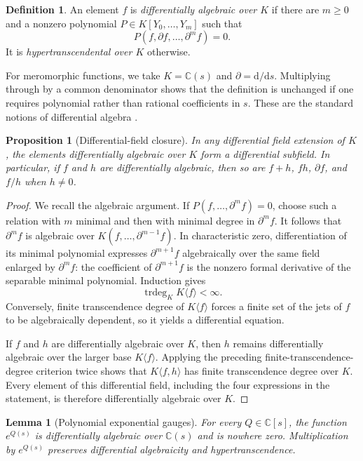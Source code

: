 \documentclass[11pt]{article}
\numberwithin{equation}{section}
\newtheorem{proposition}[theorem]{Proposition}
\newtheorem{lemma}[theorem]{Lemma}
\theoremstyle{definition}
\newtheorem{definition}[theorem]{Definition}
\theoremstyle{remark}
\newcommand{\C}{\mathbb C}
\newcommand{\dd}{\mathrm d}
\newcommand{\trdeg}{\operatorname{trdeg}}
\begin{document}
\begin{definition}
An element $f$ is \emph{differentially algebraic over $K$} if there are $m\geq0$ and a nonzero
polynomial $P\in K[Y_0,\ldots,Y_m]$ such that
\[
 P(f,\partial f,\ldots,\partial^m f)=0.
\]
It is \emph{hypertranscendental over $K$} otherwise.
\end{definition}

For meromorphic functions, we take $K=\C(s)$ and $\partial=\dd/\dd s$.  Multiplying through by a
common denominator shows that the definition is unchanged if one requires polynomial rather than
rational coefficients in $s$.  These are the standard notions of differential algebra
\cite{Ritt1950,Kolchin1973}.

\begin{proposition}[Differential-field closure]
\label{prop:da-field}
In any differential field extension of $K$, the elements differentially algebraic over $K$ form
a differential subfield.  In particular, if $f$ and $h$ are differentially algebraic, then so are
$f+h$, $fh$, $\partial f$, and $f/h$ when $h\neq0$.
\end{proposition}

\begin{proof}
We recall the algebraic argument.  If
$P(f,\ldots,\partial^m f)=0$, choose such a relation with $m$ minimal and then with minimal degree
in $\partial^m f$.  It follows that $\partial^m f$ is algebraic over
$K(f,\ldots,\partial^{m-1}f)$.  In characteristic zero, differentiation of its minimal polynomial
expresses $\partial^{m+1}f$ algebraically over the same field enlarged by $\partial^m f$: the
coefficient of $\partial^{m+1}f$ is the nonzero formal derivative of the separable minimal
polynomial.  Induction gives
\[
 \trdeg_K K\langle f\rangle<\infty.
\]
Conversely, finite transcendence degree of $K\langle f\rangle$ forces a finite set of the jets of
$f$ to be algebraically dependent, so it yields a differential equation.

If $f$ and $h$ are differentially algebraic over $K$, then $h$ remains differentially algebraic
over the larger base $K\langle f\rangle$.  Applying the preceding finite-transcendence-degree
criterion twice shows that $K\langle f,h\rangle$ has finite transcendence degree over $K$.
Every element of this differential field, including the four expressions in the statement, is
therefore differentially algebraic over $K$.
\end{proof}

\begin{lemma}[Polynomial exponential gauges]
\label{lem:exp-gauge}
For every $Q\in\C[s]$, the function $e^{Q(s)}$ is differentially algebraic over $\C(s)$ and is
nowhere zero.  Multiplication by $e^{Q(s)}$ preserves differential algebraicity and
hypertranscendence.
\end{lemma}
\end{document}
